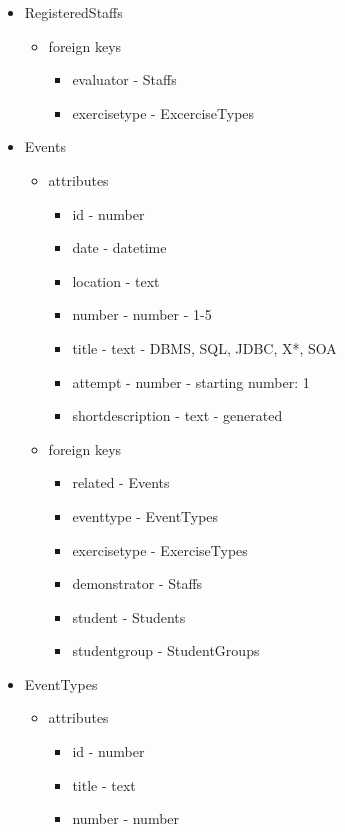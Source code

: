 \begin{itemize}
	\item RegisteredStaffs
	\begin{itemize}
		\item foreign keys
		\begin{itemize}
			\item evaluator - Staffs
			\item exercisetype - ExcerciseTypes
		\end{itemize}
	\end{itemize}
	
	\item Events
	\begin{itemize}
		\item attributes
		\begin{itemize}
			\item id - number
			\item date - datetime
			\item location - text
			\item number - number - 1-5
			\item title - text - DBMS, SQL, JDBC, X*, SOA
			\item attempt - number - starting number: 1
			\item shortdescription - text - generated
		\end{itemize}
		\item foreign keys
		\begin{itemize}
			\item related - Events
			\item eventtype - EventTypes
			\item exercisetype - ExerciseTypes
			\item demonstrator - Staffs
			\item student - Students
			\item studentgroup - StudentGroups			
		\end{itemize}
	\end{itemize}
	
	\item EventTypes
	\begin{itemize}
		\item attributes
		\begin{itemize}
			\item id - number
			\item title - text
			\item number - number
		\end{itemize}
	\end{itemize}
	

\end{itemize}
